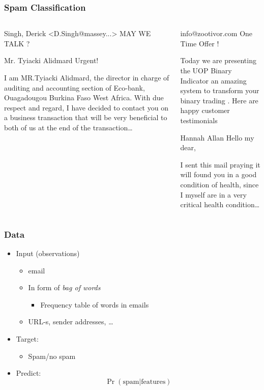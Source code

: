 \documentclass[mathserif, xcolor=table, svgnames]{beamer}
\begin{document}
\begin{frame}
  \frametitle{Spam Classification}
  \begin{columns}
    \begin{column}{0.5\linewidth}
      \begin{block}{Singh, Derick <D.Singh@massey...>}
        MAY WE TALK ?
      \end{block}
      \begin{block}{Mr. Tyiacki Alidmard }
        Urgent!

        I am MR.Tyiacki Alidmard, the director in charge of auditing and
        accounting section of Eco-bank, Ouagadougou Burkina Faso West
        Africa. With due respect and regard, I have decided to contact
        you on a business transaction that will be very beneficial to
        both of us at the end of the transaction\dots
      \end{block}
    \end{column}
    \begin{column}{0.5\linewidth}
      \begin{block}{info@zootivor.com}
        One Time Offer !

        Today we are presenting the UOP Binary Indicator an amazing
        system to transform your binary trading .  Here are happy
        customer testimonials
      \end{block}
      \begin{block}{Hannah Allan}
        Hello my dear,

        I sent this mail praying it will found you in a good condition of
        health, since I myself are in a very critical health condition\dots
      \end{block}
    \end{column}
  \end{columns}
\end{frame}

\begin{frame}
  \frametitle{Data}
  \begin{itemize}
  \item Input (observations)
    \begin{itemize}
    \item email
    \item In form of \emph{bag of words}
      \begin{itemize}
      \item Frequency table of words in emails
      \end{itemize}
    \item URL-s, sender addresses, \dots
    \end{itemize}
  \item Target:
    \begin{itemize}
    \item Spam/no spam
    \end{itemize}
  \item Predict:
    \begin{equation*}
      \Pr(\text{spam}|\text{features})
    \end{equation*}
  \end{itemize}
\end{frame}
\end{document}
